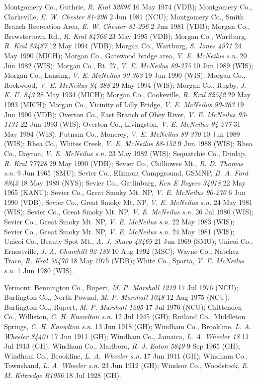 \documentclass{article}
\begin{document}
Montgomery Co., Guthrie, \textit{R. Kral 52696} 16 May 1974 (VDB);
Montgomery Co., Clarksville, \textit{E. W. Chester 81-296} 2 Jun 1981 (NCU);
Montgomery Co., Smith Branch Recreation Area, \textit{E. W. Chester 81-296} 2 Jun 1981 (VDB);
Morgan Co., Brewstertown Rd., \textit{R. Kral 84766} 23 May 1995 (VDB);
Morgan Co., Wartburg, \textit{R. Kral 83487} 12 May 1994 (VDB);
Morgan Co., Wartburg, \textit{S. Jones 4971} 24 May 1990 (MICH);
Morgan Co., Gatewood bridge area, \textit{V. E. McNeilus s.n.} 20 Jun 1982 (WIS);
Morgan Co., Rt. 27, \textit{V. E. McNeilus 89-375} 10 Jun 1989 (WIS);
Morgan Co., Lansing, \textit{V. E. McNeilus 90-363} 19 Jun 1990 (WIS);
Morgan Co., Rockwood, \textit{V. E. McNeilus 94-288} 29 May 1994 (WIS);
Morgan Co., Rugby, \textit{J. K. U. 843} 28 May 1934 (MICH);
Morgan Co., Cookeville, \textit{R. Kral 82542} 29 May 1993 (MICH);
Morgan Co., Vicinity of Lilly Bridge, \textit{V. E. McNeilus 90-363} 19 Jun 1990 (VDB);
Overton Co., East Branch of Obey River, \textit{V. E. McNeilus 93-1131} 22 Jun 1993 (WIS);
Overton Co., Livingston, \textit{V. E. McNeilus 94-277} 31 May 1994 (WIS);
Putnam Co., Monerey, \textit{V. E. McNeilus 89-370} 10 Jun 1989 (WIS);
Rhea Co., Whites Creek, \textit{V. E. McNeilus 88-152} 9 Jun 1988 (WIS);
Rhea Co., Dayton, \textit{V. E. McNeilus s.n.} 23 May 1982 (WIS);
Sequatchie Co., Dunlap, \textit{R. Kral 77728} 29 May 1990 (VDB);
Sevier Co., Chilhowee Mt., \textit{R. D. Thomas s.n.} 9 Jun 1965 (SMU);
Sevier Co., Elkmont Campground, GSMNP, \textit{B. A. Ford 8942} 18 May 1989 (NYS);
Sevier Co., Gatlinburg, \textit{Ken E Rogers 34018} 22 May 1965 (KANU);
Sevier Co., Great Smoky Mt. NP, \textit{V. E. McNeilus 90-270} 6 Jun 1990 (VDB);
Sevier Co., Great Smoky Mt. NP, \textit{V. E. McNeilus s.n.} 24 May 1981 (WIS);
Sevier Co., Great Smoky Mt. NP, \textit{V. E. McNeilus s.n.} 26 Jul 1980 (WIS);
Sevier Co., Great Smoky Mt. NP, \textit{V. E. McNeilus s.n.} 22 May 1983 (WIS);
Sevier Co., Great Smoky Mt. NP, \textit{V. E. McNeilus s.n.} 24 May 1981 (WIS);
Unicoi Co., Beauty Spot Mt., \textit{A. J. Sharp 43469} 21 Jun 1969 (SMU);
Unicoi Co., Ernestville, \textit{J. A. Churchill 92-189} 10 Aug 1992 (MSC);
Wayne Co., Natchez Trace, \textit{R. Kral 55470} 18 May 1975 (VDB);
White Co., Sparta, \textit{V. E. McNeilus s.n.} 1 Jun 1980 (WIS).

Vermont:
Bennington Co., Rupert, \textit{M. P. Marshall 1219} 17 Jul 1976 (NCU);
Burlington Co., North Pownal, \textit{M. P. Marshall 1048} 12 Aug 1975 (NCU);
Burlington Co., Rupert, \textit{M. P. Marshall 1205} 17 Jul 1976 (NCU);
Chittenden Co., Williston, \textit{C. H. Knowlton s.n.} 12 Jul 1945 (GH);
Rutland Co., Middleton Springs, \textit{C. H. Knowlton s.n.} 13 Jun 1918 (GH);
Windham Co., Brookline, \textit{L. A. Wheeler 84401} 17 Jun 1911 (GH);
Windham Co., Jamaica, \textit{L. A. Wheeler 18} 11 Jul 1913 (GH);
Windham Co., Marlboro, \textit{R. J. Eaton 5849} 9 Sep 1965 (GH);
Windham Co., Brookline, \textit{L. A. Wheeler s.n.} 17 Jun 1911 (GH);
Windham Co., Townshand, \textit{L. A. Wheeler s.n.} 23 Jun 1912 (GH);
Windsor Co., Woodstock, \textit{E. M. Kittredge B1056} 18 Jul 1928 (GH).
\end{document}
